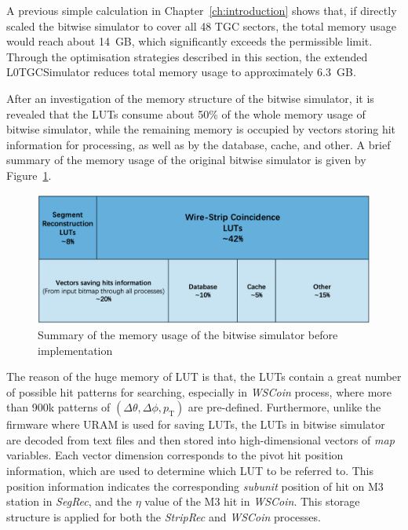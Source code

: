 A previous simple calculation in Chapter~\ref{ch:introduction} shows that, if directly scaled the bitwise simulator to cover all 48 TGC sectors, the total memory usage would reach about 14~GB, which significantly exceeds the permissible limit. Through the optimisation strategies described in this section, the extended L0TGCSimulator reduces total memory usage to approximately 6.3~GB.

After an investigation of the memory structure of the bitwise simulator, it is revealed that the LUTs consume about 50\% of the whole memory usage of bitwise simulator, while the remaining memory is occupied by vectors storing hit information for processing, as well as by the database, cache, and other. A brief summary of the memory usage of the original bitwise simulator is given by Figure~\ref{fig:LUT_memory_invest}. 

\begin{figure}[htbp]
  \centering
  \includegraphics[width=1.0\textwidth]{figs/chapter5/LUT_memory_invest.png}
  \caption{Summary of the memory usage of the bitwise simulator before implementation}
  \label{fig:LUT_memory_invest}
\end{figure}

The reason of the huge memory of LUT is that, the LUTs contain a great number of possible hit patterns for searching, especially in \textit{WSCoin} process, where more than 900k patterns of $(\Delta\theta, \Delta\phi, p_{\mathrm{T}})$ are pre-defined. Furthermore, unlike the firmware where URAM is used for saving LUTs, the LUTs in bitwise simulator are decoded from text files and then stored into high-dimensional vectors of \textit{map} variables. Each vector dimension corresponds to the pivot hit position information, which are used to determine which LUT to be referred to. This position information indicates the corresponding \textit{subunit} position of hit on M3 station in \textit{SegRec}, and the $\eta$ value of the M3 hit in \textit{WSCoin}. This storage structure is applied for both the \textit{StripRec} and \textit{WSCoin} processes.

